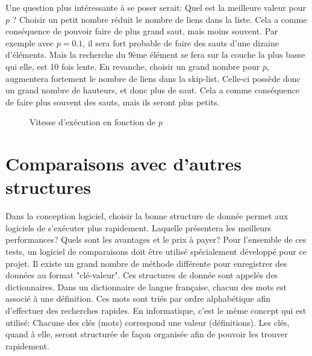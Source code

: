 \documentclass[hidelinks,a4paper, 12pt]{article}
\begin{document}
	Une question plus intéressante à se poser serait: Quel est la meilleure valeur pour $p$ ? Choisir un petit nombre réduit le nombre de liens dans la liste. Cela a comme conséquence de pouvoir faire de plus grand saut, mais moins souvent. Par exemple avec $p=0.1$, il sera fort probable de faire des sauts d'une dizaine d'éléments. Mais la recherche du 9ème élément se fera sur la couche la plus basse qui elle, est 10 fois lente. En revanche, choisir un grand nombre pour $p$, augmentera fortement le nombre de liens dans la skip-list. Celle-ci possède donc un grand nombre de hauteurs, et donc plus de saut. Cela a comme conséquence de faire plus souvent des sauts, mais ils seront plus petits.
	 
	\begin{figure}[h]
		\centering
		\caption{Vitesse d'exécution en fonction de $p$}
		\label{tbRes2}
	\end{figure}
	
	\section{Comparaisons avec d'autres structures}
	Dans la conception logiciel, choisir la bonne structure de donnée permet aux logiciels de s'exécuter plus rapidement. Laquelle présentera les meilleurs performances? Quels sont les avantages et le prix à payer? Pour l'ensemble de ces tests, un logiciel de comparaisons doit être utilisé spécialement développé pour ce projet.
	Il existe un grand nombre de méthode différente pour enregistrer des données au format "clé-valeur". Ces structures de donnée sont appelés des dictionnaires. Dans un dictionnaire de langue française, chacun des mots est associé à une définition. Ces mots sont triés par ordre alphabétique afin d'effectuer des recherches rapides. En informatique, c'est le même concept qui est utilisé: Chacune des clés (mots) correspond une valeur (définitions). Les clés, quand à elle, seront structurée de façon organisée afin de pouvoir les trouver rapidement.
	
\end{document}

